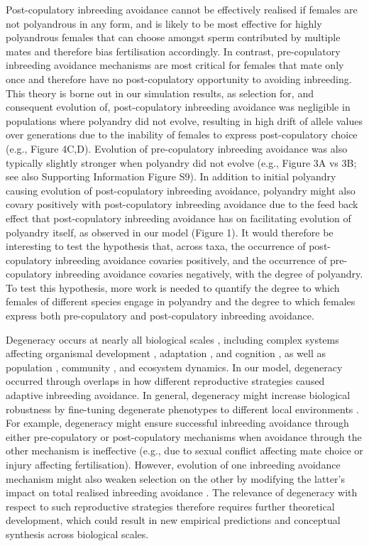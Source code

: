 \documentclass[10pt,letterpaper]{article}
\begin{document}
Post-copulatory inbreeding avoidance cannot be effectively realised if females are not polyandrous in any form, and is likely to be most effective for highly polyandrous females that can choose amongst sperm contributed by multiple mates and therefore bias fertilisation accordingly. In contrast, pre-copulatory inbreeding avoidance mechanisms are most critical for females that mate only once and therefore have no post-copulatory opportunity to avoiding inbreeding. This theory is borne out in our simulation results, as selection for, and consequent evolution of, post-copulatory inbreeding avoidance was negligible in populations where polyandry did not evolve, resulting in high drift of allele values over generations due to the inability of females to express post-copulatory choice (e.g., Figure 4C,D). Evolution of pre-copulatory inbreeding avoidance was also typically slightly stronger when polyandry did not evolve (e.g., Figure 3A vs 3B; see also Supporting Information Figure S9). In addition to initial polyandry causing evolution of post-copulatory inbreeding avoidance, polyandry might also covary positively with post-copulatory inbreeding avoidance due to the feed back effect that post-copulatory inbreeding avoidance has on facilitating evolution of polyandry itself, as observed in our model (Figure 1). It would therefore be interesting to test the hypothesis that, across taxa, the occurrence of post-copulatory inbreeding avoidance covaries positively, and the occurrence of pre-copulatory inbreeding avoidance covaries negatively, with the degree of polyandry. To test this hypothesis, more work is needed to quantify the degree to which females of different species engage in polyandry and the degree to which females express both pre-copulatory and post-copulatory inbreeding avoidance.

Degeneracy occurs at nearly all biological scales \cite[][]{Edelman2001}, including complex systems affecting organismal development \cite[e.g.,][]{Nowak1997}, adaptation \cite[][]{Whitacre2010, Whitacre2010a}, and cognition \cite[][]{Price2002, Park2013}, as well as population \cite[][]{Atamas2009}, community \cite[][]{Suraci2017}, and ecosystem \cite[e.g.,][]{Levin2008} dynamics. In our model, degeneracy occurred through overlaps in how different reproductive strategies caused adaptive inbreeding avoidance. In general, degeneracy might increase biological robustness by fine-tuning degenerate phenotypes to different local environments \cite[][]{Gardner2006, Whitacre2010a}. For example, degeneracy might ensure successful inbreeding avoidance through either pre-copulatory or post-copulatory mechanisms when avoidance through the other mechanism is ineffective (e.g., due to sexual conflict affecting mate choice or injury affecting fertilisation). However, evolution of one inbreeding avoidance mechanism might also weaken selection on the other by modifying the latter's impact on total realised inbreeding avoidance \cite[\textit{sensu} evolution of genetic redundancy; see][]{Nowak1997}. The relevance of degeneracy with respect to such reproductive strategies therefore requires further theoretical development, which could result in new empirical predictions and conceptual synthesis across biological scales. 
\end{document}
